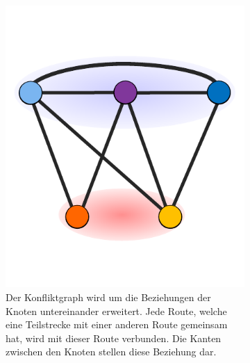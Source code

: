 \begin{figure}
\begin{subfigure}[t]{0.3\textwidth}
		\includegraphics[width=\textwidth]{img/bsp4}
		\caption{Der Konfliktgraph wird um die Beziehungen der Knoten untereinander erweitert. Jede Route, welche eine Teilstrecke mit einer anderen Route
		gemeinsam hat, wird mit dieser Route verbunden. Die Kanten zwischen den Knoten stellen diese Beziehung dar.}
		\label{fig:example:d}
	\end{subfigure}
	\begin{subfigure}[t]{0.3\textwidth}

\end{subfigure}
\end{figure}
